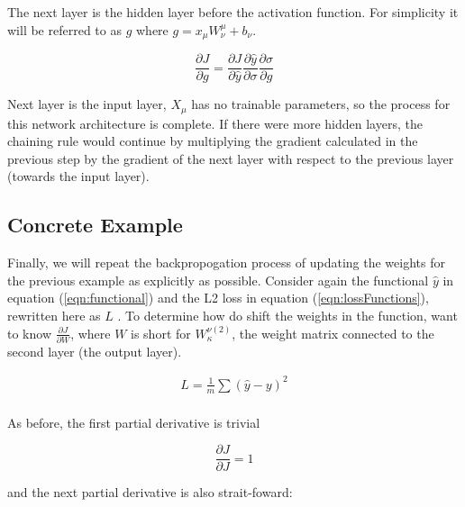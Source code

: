 \noindent The next layer is the hidden layer before the activation function. For simplicity it will be referred to as $ g $ where $ g = x_\mu W_\nu ^\mu + b_\nu $.  

\begin{equation}
    \frac{\partial J}{\partial g} = \frac{\partial J}{\partial \hat{y}} \frac{\partial \hat{y}}{\partial \sigma} \frac{\partial \sigma}{\partial g}
\end{equation}


\noindent Next layer is the input layer, $ X_\mu $ has no trainable parameters, so the process for this network architecture is complete. If there were more hidden layers, the chaining rule would continue by multiplying the gradient calculated in the previous step by the gradient of the next layer with respect to the previous layer (towards the input layer). 


\subsection{Concrete Example}

Finally, we will repeat the backpropogation process of updating the weights for the previous example as explicitly as possible. Consider again the functional $ \hat{y} $ in equation (\ref{eqn:functional}) and the L2 loss in equation (\ref{eqn:lossFunctions}), rewritten here as $ L $ . To determine how do shift the weights in the function, want to know $\frac{\partial J}{\partial W}$, where $ W  $ is short for $ W_\kappa ^{\nu (2)} $, the weight matrix connected to the second layer (the output layer). 

\begin{align}
L = \frac{1}{m}\sum(\hat{y} - y)^2 \\
\end{align}

\noindent As before, the first partial derivative is trivial

\begin{equation}
    \frac{\partial J}{\partial J} = 1
\end{equation}

\noindent and the next partial derivative is also strait-foward:

